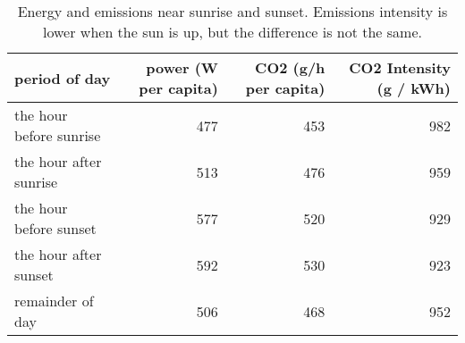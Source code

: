 \begin{table}

\caption[Energy and emissions near sunrise and sunset]{\label{tab:sunrise emissions stats}Energy and emissions near sunrise and sunset. Emissions intensity is lower when the sun is up, but the difference is not the same.}
\centering
\begin{tabular}[t]{lrrr}
\toprule
period of day & power (W per capita) & CO2 (g/h per capita) & CO2 Intensity (g / kWh)\\
\midrule
the hour before sunrise & 477 & 453 & 982\\

the hour after sunrise & 513 & 476 & 959\\

the hour before sunset & 577 & 520 & 929\\

the hour after sunset & 592 & 530 & 923\\

remainder of day & 506 & 468 & 952\\
\bottomrule
\end{tabular}
\end{table}
